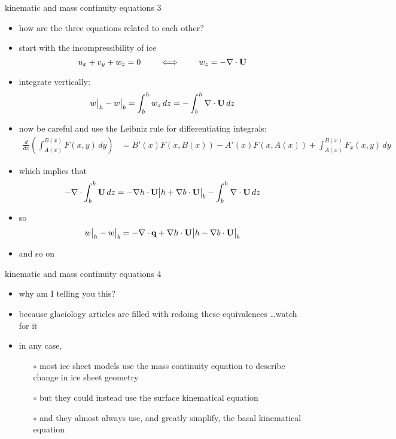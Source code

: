 \begin{frame}{kinematic and mass continuity equations 3}

\begin{itemize}
\small
\item how are the three equations related to each other?
\item start with the incompressibility of ice
    $$u_x + v_y + w_z = 0 \qquad \iff \qquad w_z = - \nabla\cdot \mathbf{U}$$
\item integrate vertically:
    $$w\big|_h - w\big|_b = \int_b^h w_z\,dz = - \int_b^h \nabla\cdot \mathbf{U}\,dz$$
\item now be careful and use the Leibniz rule for differentiating integrals:
\scriptsize
  \begin{align*}
\frac{d}{dx}\left(\int_{A(x)}^{B(x)} F(x,y)\,dy\right) &= B'(x) F(x,B(x)) - A'(x) F(x,A(x)) + \int_{A(x)}^{B(x)} F_x(x,y)\,dy
  \end{align*}
\small
\item which implies that
   $$- \nabla\cdot \int_b^h \mathbf{U}\,dz = - \nabla h \cdot \mathbf{U}\big|h + \nabla b \cdot \mathbf{U}\big|_b - \int_b^h \nabla\cdot \mathbf{U}\,dz$$
\item so
    $$w\big|_h - w\big|_b = - \nabla\cdot \mathbf{q} + \nabla h \cdot \mathbf{U}\big|h - \nabla b \cdot \mathbf{U}\big|_b$$
\item and so on
\normalsize
\end{itemize}
\end{frame}


\begin{frame}{kinematic and mass continuity equations 4}

\begin{itemize}
\item why am I telling you this?
\item because glaciology articles are filled with redoing these equivalences \dots watch for it

\vspace{5mm}
\item in any case,
  \begin{itemize}
  \item[$\circ$] most ice sheet models use the mass continuity equation to describe change in ice sheet geometry
  \item[$\circ$] but they could instead use the surface kinematical equation
  \item[$\circ$] and they almost always use, and greatly simplify, the basal kinematical equation
  \end{itemize}
\end{itemize}
\end{frame}



